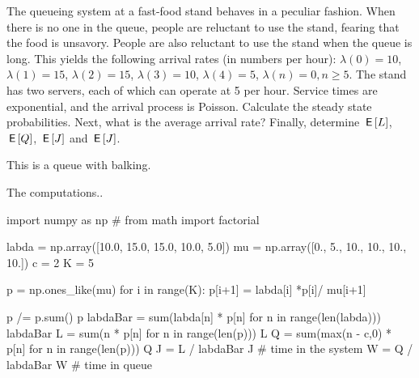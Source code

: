 \begin{exercise}[Hall 5.8]\label{ex:39}
The queueing system at a fast-food stand behaves in a peculiar fashion.
 When there is no one in the queue, people are reluctant to use the stand, fearing that the food is unsavory.
 People are also reluctant to use the stand when the queue is long.
 This yields the following arrival rates (in numbers per hour): $\lambda(0) = 10$, $\lambda(1)=15$, $\lambda(2)=15$, $\lambda(3)=10$, $\lambda(4)=5$, $\lambda(n)=0, n\geq 5$.
 The stand has two servers, each of which can operate at 5 per hour.
 Service times are exponential, and the arrival process is Poisson.
 Calculate the steady state probabilities.
 Next, what is the average arrival rate?
 Finally, determine $\,\mathsf{E}\left[L\right]$, $\,\mathsf{E}\left[Q\right]$, $\,\mathsf{E}\left[J\right]$ and $\,\mathsf{E}\left[J\right]$.
\begin{hint}
This is a queue with balking.    
\end{hint}
\begin{solution}
The computations..
\begin{pyconsole}
import numpy as np
# from math import factorial

labda = np.array([10.0, 15.0, 15.0, 10.0, 5.0])
mu = np.array([0., 5., 10., 10., 10., 10.])
c = 2
K = 5

p = np.ones_like(mu)
for i in range(K):
    p[i+1] = labda[i] *p[i]/ mu[i+1]

p /= p.sum()
p
labdaBar = sum(labda[n] * p[n] for n in range(len(labda)))
labdaBar
L = sum(n * p[n] for n in range(len(p)))
L
Q = sum(max(n - c,0) * p[n] for n in range(len(p)))
Q
J = L / labdaBar
J  # time in the system
W = Q / labdaBar
W  # time in queue
\end{pyconsole} 

\end{solution}
\end{exercise}

